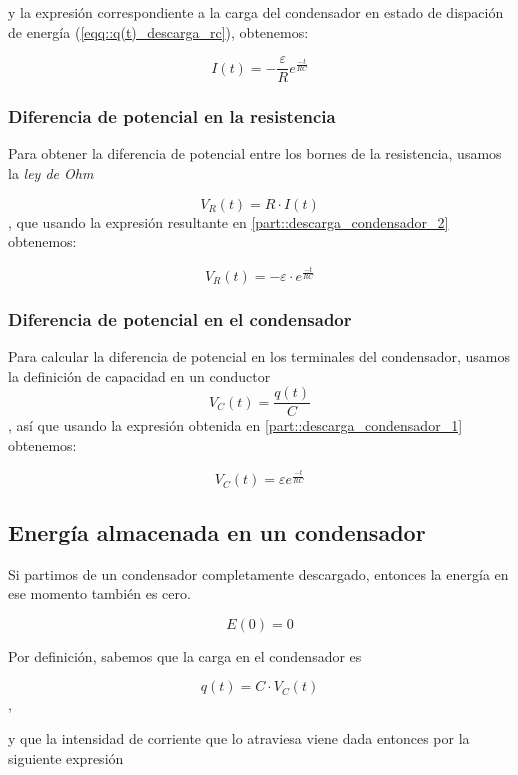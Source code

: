 \documentclass[../main.tex]{subfiles}
\begin{document}
y la expresión correspondiente a la carga del condensador en estado de dispación de energía (\ref{eqq::q(t)_descarga_rc}), obtenemos:

\begin{equation}
    I(t) = -\frac{\varepsilon}{R} e^{\frac{-t}{RC}} 
\end{equation}



\subsubsection{Diferencia de potencial en la resistencia}
\label{part::descarga_condensador_3}
Para obtener la diferencia de potencial entre los bornes de la resistencia, usamos la \textit{ley de Ohm}

$$V_R(t) = R \cdot I(t)$$
, que usando la expresión resultante en \ref{part::descarga_condensador_2} obtenemos:

\begin{equation}
    V_R(t) = -\varepsilon \cdot e^{\frac{-t}{RC}}
\end{equation}


\subsubsection{Diferencia de potencial en el condensador}
\label{part::descarga_condensador_4}
Para calcular la diferencia de potencial en los terminales del condensador, usamos la definición de capacidad en un conductor
$$V_C(t) = \frac{q(t)}{C}$$
, así que usando la expresión obtenida en \ref{part::descarga_condensador_1} obtenemos:

\begin{equation}
    V_C(t) = \varepsilon  e^{\frac{-t}{RC}}
\end{equation}



\subsection{Energía almacenada en un condensador}
\label{part::energia_condensador}
Si partimos de un condensador completamente descargado, entonces la energía en ese momento también es cero.

$$E(0) = 0$$

Por definición, sabemos que la carga en el condensador es

$$q(t) = C \cdot V_C(t)$$, 

y que la intensidad de corriente que lo atraviesa viene dada entonces por la siguiente expresión
\end{document}
